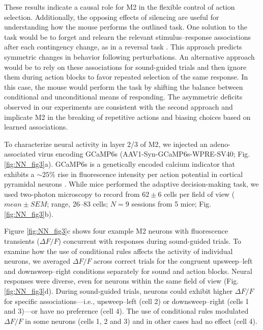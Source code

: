 These results indicate a causal role for M2 in the flexible control of action selection. Additionally, the opposing effects of silencing are useful for understanding how the mouse performs the outlined task. One solution to the task would be to forget and relearn the relevant stimulus–response associations after each contingency change, as in a reversal task \citep{fusi2007neural}. This approach predicts symmetric changes in behavior following perturbations. An alternative approach would be to rely on these associations for sound-guided trials and then ignore them during action blocks to favor repeated selection of the same response. In this case, the mouse would perform the task by shifting the balance between conditional and unconditional means of responding. The asymmetric deficits observed in our experiments are consistent with the second approach and implicate M2 in the breaking of repetitive actions and biasing choices based on learned associations.

To characterize neural activity in layer 2/3 of M2, we injected an adeno-associated virus encoding GCaMP6s (AAV1-Syn-GCaMP6s-WPRE-SV40; Fig. \ref{fig:NN_fig3}a). GCaMP6s is a genetically encoded calcium indicator that exhibits a $\sim 25\%$ rise in fluorescence intensity per action potential in cortical pyramidal neurons \citep{chen2013ultrasensitive}. While mice performed the adaptive decision-making task, we used two-photon microscopy to record from $62 \pm 6$ cells per field of view ($\mathit{mean}\pm\mathit{SEM}$; range, 26–83 cells; $N = 9$ sessions from 5 mice; Fig. \ref{fig:NN_fig3}b). 


Figure \ref{fig:NN_fig3}c shows four example M2 neurons with fluorescence transients ($\Delta F/F$) concurrent with responses during sound-guided trials. To examine how the use of conditional rules affects the activity of individual neurons, we averaged $\Delta F/F$ across correct trials for the congruent upsweep–left and downsweep–right conditions separately for sound and action blocks. Neural responses were diverse, even for neurons within the same field of view (Fig. \ref{fig:NN_fig3}d). During sound-guided trials, neurons could exhibit higher $\Delta F/F$ for specific associations---i.e., upsweep–left (cell 2) or downsweep–right (cells 1 and 3)---or have no preference (cell 4). The use of conditional rules modulated $\Delta F/F$ in some neurons (cells 1, 2 and 3) and in other cases had no effect (cell 4).

